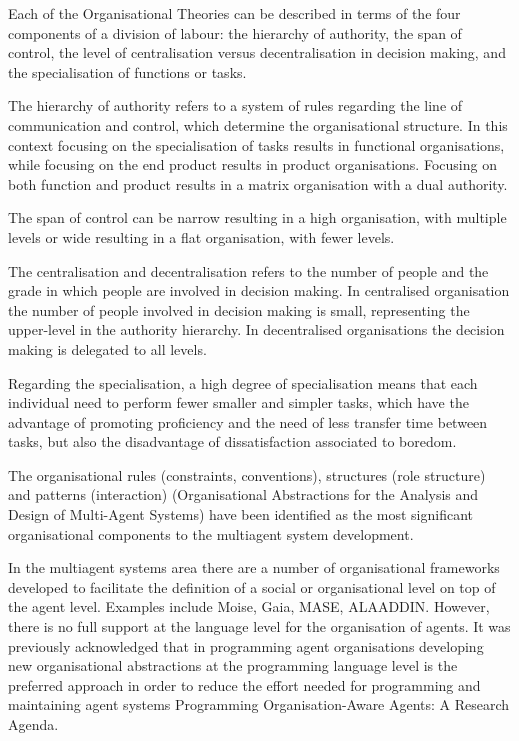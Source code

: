 \documentclass[a4paper,12pt,oneside,fleqn]{book} %
\theoremstyle{plain}
\theoremstyle{definition}
\theoremstyle{remark}
\begin{document}
Each of the Organisational Theories can be described in terms of the four
components of a division of labour: the hierarchy of authority, the span of
control, the level of centralisation versus decentralisation in decision
making, and the specialisation of functions or tasks.

The hierarchy of authority refers to a system of rules regarding the line
of communication and control, which determine the organisational structure.
In this context focusing on the specialisation of tasks results in
functional organisations, while focusing on the end product results in
product organisations. Focusing on both function and product results in a
matrix organisation with a dual authority.

The span of control can be narrow resulting in a high organisation, with
multiple levels or wide resulting in a flat organisation, with fewer levels.

The centralisation and decentralisation refers to the number of people and
the grade in which people are involved in decision making. In centralised
organisation the number of people involved in decision making is small,
representing the upper-level in the authority hierarchy. In decentralised
organisations the decision making is delegated to all levels.

Regarding the specialisation, a high degree of specialisation means that
each individual need to perform fewer smaller and simpler tasks, which have
the advantage of promoting proficiency and the need of less transfer time
between tasks, but also the disadvantage of dissatisfaction associated to
boredom. 

The organisational rules (constraints, conventions), structures (role
structure) and patterns (interaction)\cite{} (Organisational
Abstractions for the Analysis and Design of Multi-Agent Systems) have been
identified as the most significant organisational components to the
multiagent system development.

In the multiagent systems area there are a number of organisational
frameworks developed to facilitate the definition of a social or
organisational level on top of the agent level. Examples include Moise,
Gaia, MASE, ALAADDIN. However, there is no full support at the language
level for the organisation of agents. It was previously acknowledged that
in programming agent organisations developing new organisational
abstractions at the programming language level is the preferred approach in
order to reduce the effort needed for programming and maintaining agent
systems\cite{} Programming Organisation-Aware Agents: A Research Agenda.
\end{document}
